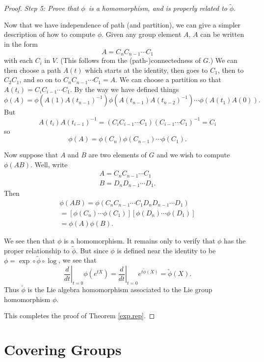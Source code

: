\documentclass{amsbook}
\theoremstyle{plain}
\numberwithin{equation}{chapter}
\numberwithin{theorem}{chapter}
\begin{document}
\begin{proof}
\textit{Step 5: Prove that }$\phi$\textit{\ is a homomorphism, and is properly
related to }$\widetilde{\phi}$.

Now that we have independence of path (and partition), we can give a simpler
description of how to compute $\phi$. Given any group element $A$, $A$ can be
written in the form
\[
A=C_{n}C_{n-1}\cdots C_{1}%
\]
with each $C_{i}$ in $V$. (This follows from the (path-)connectedness of $G$.)
We can then choose a path $A(t)$ which starts at the identity, then goes to
$C_{1}$, then to $C_{2}C_{1}$, and so on to $C_{n}C_{n-1}\cdots C_{1}=A$. We
can choose a partition so that $A(t_{i})=C_{i}C_{i-1}\cdots C_{1}$. By the way
we have defined things
\[
\phi(A)=\phi\left(  A(1)A(t_{n-1})^{-1}\right)  \phi\left(  A(t_{n-1}%
)A(t_{n-2})^{-1}\right)  \cdots\phi\left(  A(t_{1})A(0)\right)  \text{.}%
\]
But
\[
A(t_{i})A(t_{i-1})^{-1}=\left(  C_{i}C_{i-1}\cdots C_{1}\right)  \left(
C_{i-1}\cdots C_{1}\right)  ^{-1}=C_{i}%
\]
so
\[
\phi(A)=\phi(C_{n})\phi(C_{n-1})\cdots\phi(C_{1})\text{.}%
\]

Now suppose that $A$ and $B$ are two elements of $G$ and we wish to compute
$\phi(AB)$. Well, write
\begin{align*}
A=C_{n}C_{n-1}\cdots C_{1}\\
B=D_{n}D_{n-1}\cdots D_{1}\text{.}%
\end{align*}
Then
\begin{align*}
\phi\left(  AB\right)  =\phi\left(  C_{n}C_{n-1}\cdots C_{1}D_{n}D_{n-1}\cdots
D_{1}\right)  \\
=\left[  \phi(C_{n})\cdots\phi(C_{1})\right]  \left[  \phi(D_{n})\cdots
\phi(D_{1})\right]  \\
=\phi(A)\phi(B)\text{.}%
\end{align*}

We see then that $\phi$ is a homomorphism. It remains only to verify that
$\phi$ has the proper relationship to $\widetilde{\phi}$. But since $\phi$ is
defined near the identity to be $\phi=\exp\circ\widetilde{\phi}\circ\log$, we
see that
\[
\left.  \frac{d}{dt}\right|  _{t=0}\phi\left(  e^{tX}\right)  =\left.
\frac{d}{dt}\right|  _{t=0}e^{t\widetilde{\phi}(X)}=\widetilde{\phi
}(X)\text{.}%
\]
Thus $\widetilde{\phi}$ is the Lie algebra homomorphism associated to the Lie
group homomorphism $\phi$.

This completes the proof of Theorem \ref{exp.rep}.
\end{proof}

\section{Covering Groups}
\end{document}
